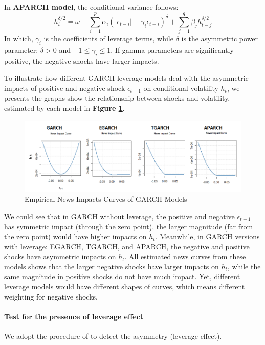 \documentclass[a4paper]{article}
\begin{document}
\subparagraph*{}
In \textbf{APARCH model}, the conditional variance follows:
\[h_t^{\delta / 2} = \omega + \sum^p_{i=1} \alpha_i (|\epsilon_{t-i}| - \gamma_i \epsilon_{t-i})^{\delta} + \sum^{q}_{j=1} \beta_j h_{t-j}^{\delta/2}\]
In which, $\gamma_i$ is the coefficients of leverage terms, while $\delta$ is the asymmetric power parameter: $\delta > 0$ and $-1 \leq \gamma_i \leq 1$. If gamma parameters are significantly positive, the negative shocks have larger impacts. 

To illustrate how different GARCH-leverage models deal with the asymmetric impacts of positive and negative shock $\epsilon_{t-1}$ on conditional volatility $h_t$, we presents the graphs show the relationship between shocks and volatility, estimated by each model in \textbf{Figure \ref{fig:news_curve}}. 

\begin{figure}[h]
\centering
\includegraphics[width=0.6\textheight]{news_impact_curve.png}
\caption{\label{fig:news_curve}Empirical News Impacts Curves of GARCH Models}
\end{figure}

We could see that in GARCH without leverage, the positive and negative $\epsilon_{t-1}$ has symmetric impact (through the zero point), the larger magnitude (far from the zero point) would have higher impacts on $h_t$. Meanwhile, in GARCH versions with leverage: EGARCH, TGARCH, and APARCH, the negative and positive shocks have asymmetric impacts on $h_t$. All estimated news curves from these models shows that the larger negative shocks have larger impacts on $h_t$, while the same magnitude in positive shocks do not have much impact. Yet, different leverage models would have different shapes of curves, which means different weighting for negative shocks.   

\paragraph{Test for the presence of leverage effect}
We adopt the procedure of \cite{engle1993measuring} to detect the asymmetry (leverage effect). 
\end{document}

